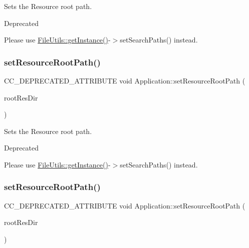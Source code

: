 Sets the Resource root path. \begin{DoxyRefDesc}{Deprecated}
\item[\hyperlink{deprecated__deprecated000120}{Deprecated}]Please use \hyperlink{classFileUtils_ac8ced4394d59f5459445ced27ccd0e8a}{File\+Utils\+::get\+Instance()}-\/$>$set\+Search\+Paths() instead. \end{DoxyRefDesc}
\mbox{\label{classApplication_a0df1abee182d6a9f3d2a318941aace4f}} 
\subsubsection{\texorpdfstring{set\+Resource\+Root\+Path()}{setResourceRootPath()}\hspace{0.1cm}{\footnotesize\ttfamily [6/8]}}
{\footnotesize\ttfamily C\+C\+\_\+\+D\+E\+P\+R\+E\+C\+A\+T\+E\+D\+\_\+\+A\+T\+T\+R\+I\+B\+U\+TE void Application\+::set\+Resource\+Root\+Path (\begin{DoxyParamCaption}\item[{const std\+::string \&}]{root\+Res\+Dir }\end{DoxyParamCaption})}

Sets the Resource root path. \begin{DoxyRefDesc}{Deprecated}
\item[\hyperlink{deprecated__deprecated000355}{Deprecated}]Please use \hyperlink{classFileUtils_ac8ced4394d59f5459445ced27ccd0e8a}{File\+Utils\+::get\+Instance()}-\/$>$set\+Search\+Paths() instead. \end{DoxyRefDesc}
\mbox{\label{classApplication_a0df1abee182d6a9f3d2a318941aace4f}} 
\subsubsection{\texorpdfstring{set\+Resource\+Root\+Path()}{setResourceRootPath()}\hspace{0.1cm}{\footnotesize\ttfamily [7/8]}}
{\footnotesize\ttfamily C\+C\+\_\+\+D\+E\+P\+R\+E\+C\+A\+T\+E\+D\+\_\+\+A\+T\+T\+R\+I\+B\+U\+TE void Application\+::set\+Resource\+Root\+Path (\begin{DoxyParamCaption}\item[{const std\+::string \&}]{root\+Res\+Dir }\end{DoxyParamCaption})}

